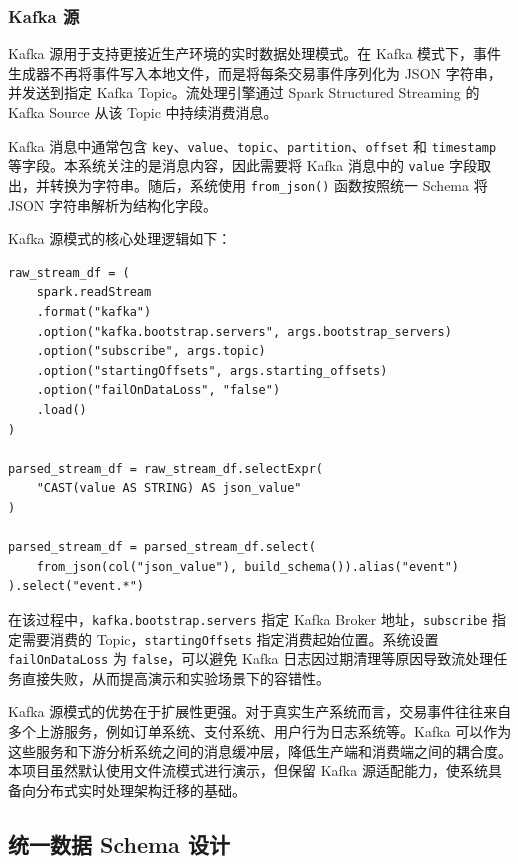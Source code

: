\documentclass[12pt,hyperref,a4paper,UTF8]{ctexart}
\begin{document}
\subsubsection{Kafka 源}

Kafka 源用于支持更接近生产环境的实时数据处理模式。在 Kafka 模式下，事件生成器不再将事件写入本地文件，而是将每条交易事件序列化为 JSON 字符串，并发送到指定 Kafka Topic。流处理引擎通过 Spark Structured Streaming 的 Kafka Source 从该 Topic 中持续消费消息。

Kafka 消息中通常包含 \texttt{key}、\texttt{value}、\texttt{topic}、\texttt{partition}、\texttt{offset} 和 \texttt{timestamp} 等字段。本系统关注的是消息内容，因此需要将 Kafka 消息中的 \texttt{value} 字段取出，并转换为字符串。随后，系统使用 \texttt{from\_json()} 函数按照统一 Schema 将 JSON 字符串解析为结构化字段。

Kafka 源模式的核心处理逻辑如下：

\begin{verbatim}
raw_stream_df = (
    spark.readStream
    .format("kafka")
    .option("kafka.bootstrap.servers", args.bootstrap_servers)
    .option("subscribe", args.topic)
    .option("startingOffsets", args.starting_offsets)
    .option("failOnDataLoss", "false")
    .load()
)

parsed_stream_df = raw_stream_df.selectExpr(
    "CAST(value AS STRING) AS json_value"
)

parsed_stream_df = parsed_stream_df.select(
    from_json(col("json_value"), build_schema()).alias("event")
).select("event.*")
\end{verbatim}

在该过程中，\texttt{kafka.bootstrap.servers} 指定 Kafka Broker 地址，\texttt{subscribe} 指定需要消费的 Topic，\texttt{startingOffsets} 指定消费起始位置。系统设置 \texttt{failOnDataLoss} 为 \texttt{false}，可以避免 Kafka 日志因过期清理等原因导致流处理任务直接失败，从而提高演示和实验场景下的容错性。

Kafka 源模式的优势在于扩展性更强。对于真实生产系统而言，交易事件往往来自多个上游服务，例如订单系统、支付系统、用户行为日志系统等。Kafka 可以作为这些服务和下游分析系统之间的消息缓冲层，降低生产端和消费端之间的耦合度。本项目虽然默认使用文件流模式进行演示，但保留 Kafka 源适配能力，使系统具备向分布式实时处理架构迁移的基础。

\subsection{统一数据 Schema 设计}
\end{document}
